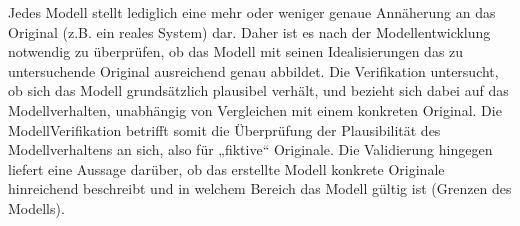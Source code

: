 \documentclass[letterpaper,10pt,german]{jupyterBook}
\begin{document}
\sphinxAtStartPar
{}

\sphinxAtStartPar
Jedes Modell stellt lediglich eine mehr oder weniger genaue Annäherung an das Original (z.B. ein reales System) dar. Daher ist es nach der Modellentwicklung notwendig zu überprüfen, ob das Modell mit seinen Idealisierungen das zu untersuchende Original ausreichend genau abbildet. Die Verifikation untersucht, ob sich das Modell grundsätzlich plausibel verhält, und bezieht sich dabei auf das Modellverhalten, unabhängig von Vergleichen mit einem konkreten Original. Die Modell\sphinxhyphen{}Verifikation betrifft somit die Überprüfung der Plausibilität des Modellverhaltens an sich, also für „fiktive“ Originale. Die Validierung hingegen liefert eine Aussage darüber, ob das erstellte Modell konkrete Originale hinreichend beschreibt und in welchem Bereich das Modell gültig ist (Grenzen des Modells).
\end{document}
